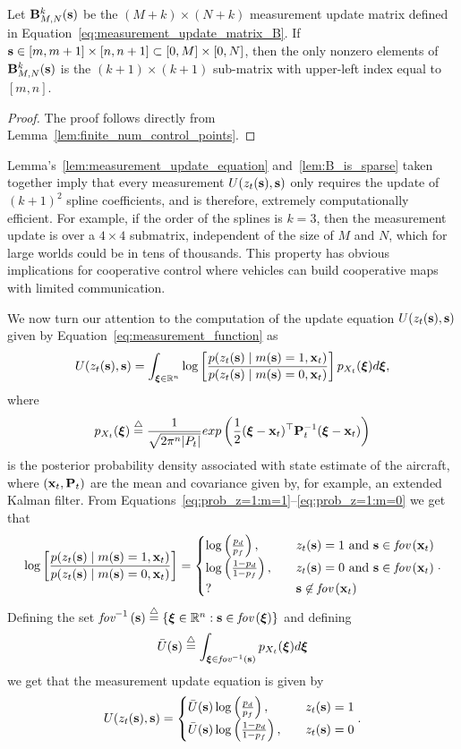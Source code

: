 \begin{lemma} \label{lem:B_is_sparse}
Let $\mathbf{B}_{M,N}^k(\mathbf{s})$
be the $(M+k)\times(N+k)$ measurement update matrix defined in Equation~\eqref{eq:measurement_update_matrix_B}.  
If $\mathbf{s} \in [m, m+1]\times[n, n+1] \subset [0, M]\times[0,N]$, then the only nonzero elements of $\mathbf{B}_{M,N}^k(\mathbf{s})$ is the $(k+1)\times(k+1)$ sub-matrix with upper-left index equal to $[m,n]$.
\end{lemma}
\begin{proof}
The proof follows directly from Lemma~\ref{lem:finite_num_control_points}.	
\end{proof}

Lemma's~\ref{lem:measurement_update_equation} and~\ref{lem:B_is_sparse} taken together imply that every measurement $U(z_t(\mathbf{s}), \mathbf{s})$ only requires the update of $(k+1)^2$ spline coefficients, and is therefore, extremely computationally efficient.  For example, if the order of the splines is $k=3$, then the measurement update is over a $4\times 4$ submatrix, independent of the size of $M$ and $N$, which for large worlds could be in tens of thousands.  This property has obvious implications for cooperative control where vehicles can build cooperative maps with limited communication.  


We now turn our attention to the computation of the update equation $U(z_t(\mathbf{s}), \mathbf{s})$ given by Equation~\eqref{eq:measurement_function} as
\[
U(z_t(\mathbf{s}), \mathbf{s}) = \int_{\boldsymbol{\xi}\in\mathbb{R}^n}\log\left[ \frac{p(z_t(\mathbf{s})\mid m(\mathbf{s})=1, \mathbf{x}_t)}{p(z_t(\mathbf{s})\mid m(\mathbf{s})=0, \mathbf{x}_t)}\right]p_{X_t}(\boldsymbol{\xi})d\boldsymbol{\xi},
\]
where 
\[
p_{X_t}(\boldsymbol{\xi}) \stackrel{\triangle}{=} \frac{1}{\sqrt{2\pi^n|P_t|}}exp\left(\frac{1}{2}(\boldsymbol{\xi}-\mathbf{x}_t)^\top \mathbf{P}_t^{-1} (\boldsymbol{\xi}-\mathbf{x}_t)\right)
\]
is the posterior probability density associated with state estimate of the aircraft, where $(\mathbf{x}_t, \mathbf{P}_t)$ are the mean and covariance given by, for example, an extended Kalman filter.
From Equations~\eqref{eq:prob_z=1:m=1}--\eqref{eq:prob_z=1:m=0} we get that 
\[
\log\left[ \frac{p(z_t(\mathbf{s})\mid m(\mathbf{s})=1, \mathbf{x}_t)}{p(z_t(\mathbf{s})\mid m(\mathbf{s})=0, \mathbf{x}_t)}\right] 
	= \begin{cases}
 		\log\left(\frac{p_d}{p_f}\right), &\quad z_t(\mathbf{s})=1 \text{~and~} \mathbf{s}\in\text{\em fov}\left(\mathbf{x}_t\right) \\
 		\log\left(\frac{1-p_d}{1-p_f}\right), &\quad z_t(\mathbf{s})=0 \text{~and~} \mathbf{s}\in\text{\em fov}\left(\mathbf{x}_t\right) \\
 		? &\quad \mathbf{s}\not\in\text{\em fov}\left(\mathbf{x}_t\right)
 	  \end{cases}.
\]
Defining the set $\text{\em fov}^{-1}\left(\mathbf{s}\right)\stackrel{\triangle}{=}\{\boldsymbol{\xi}\in\mathbb{R}^n: \mathbf{s}\in\text{\em fov}\left(\boldsymbol{\xi}\right)\}$ and defining 
\begin{equation}\label{eq:Ubar}
\bar{U}(\sbf) \defeq \int_{\xibf\in\fovinv{\sbf}} p_{X_t}(\xibf)d\xibf
\end{equation}
we get that the measurement update equation is given by
\[
U(z_t(\mathbf{s}), \mathbf{s}) = 
	\begin{cases}
 		\bar{U}(\mathbf{s})\log\left(\frac{p_d}{p_f}\right), &\quad z_t(\mathbf{s})=1 \\
 		\bar{U}(\mathbf{s})\log\left(\frac{1-p_d}{1-p_f}\right), &\quad z_t(\mathbf{s})=0
 	  \end{cases}.
\]

